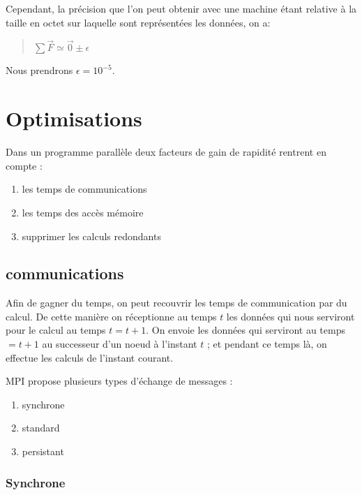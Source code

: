\par Cependant, la précision que l'on peut obtenir avec une machine étant relative à 
la taille en octet sur laquelle sont représentées les données, on a:
\begin{quote}
  \begin{center}
    $\sum \overrightarrow{F} \simeq \overrightarrow{0} \pm \epsilon$
  \end{center}
\end{quote}
Nous prendrons $\epsilon = 10^{-5}$.

\section{Optimisations}

\par Dans un programme parallèle deux facteurs de gain de rapidité rentrent en compte : 
\begin{enumerate}
\item les temps de communications
\item les temps des accès mémoire
\item supprimer les calculs redondants
\end{enumerate}

\subsection{communications}

\par Afin de gagner du temps, on peut recouvrir les temps de communication par du calcul. De
cette manière on réceptionne au temps $t$ les données qui nous serviront pour le
calcul au temps $t=t+1$. On envoie les données qui serviront au temps $=t+1$
au successeur d'un noeud à l'instant $t$ ; et pendant ce temps là, on effectue les calculs 
de l'instant courant.\\

\par MPI propose plusieurs types d'échange de messages :\\
\begin{enumerate}
\item[\textbullet] synchrone
\item[\textbullet] standard
\item[\textbullet] persistant
\end{enumerate}

\subsubsection{Synchrone}

